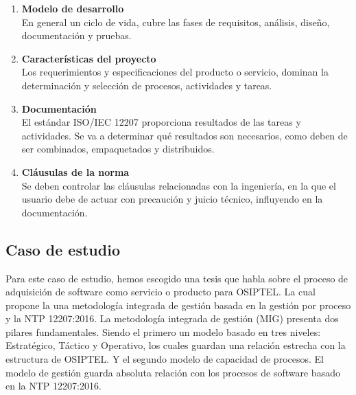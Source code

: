 \documentclass{article}
\begin{document}
\begin{enumerate}
\begin{enumerate}
            \item \textbf{Modelo de desarrollo}\\
                En general un ciclo de vida, cubre las fases de
                requisitos, análisis, diseño, documentación y pruebas.
            
            \item \textbf{Características del proyecto}\\
                Los requerimientos y especificaciones del
                producto o servicio, dominan la determinación y selección de
                procesos, actividades y tareas.

            \item \textbf{Documentación}\\
                El estándar ISO/IEC 12207 proporciona resultados
                de las tareas y actividades. Se va a determinar qué resultados
                son necesarios, como deben de ser combinados, empaquetados y
                distribuidos.
            
            \item \textbf{Cláusulas de la norma}\\
                Se deben controlar las cláusulas relacionadas
                con la ingeniería, en la que el usuario debe de actuar con
                precaución y juicio técnico, influyendo en la documentación.
            
        \end{enumerate}
        
\end{enumerate}

\subsection{Caso de estudio}\label{sec:Caso de Estudio}

Para este caso de estudio, hemos escogido una tesis \nocite{quinteros_estefani2019} que habla
sobre el proceso de adquisición de software como servicio o producto para
OSIPTEL. La cual propone la una metodología integrada de gestión basada en la
gestión por proceso y la NTP 12207:2016. La metodología integrada de gestión
(MIG) presenta dos pilares fundamentales. Siendo el primero un modelo basado en
tres niveles: Estratégico, Táctico y Operativo, los cuales guardan una relación
estrecha con la estructura de OSIPTEL. Y el segundo modelo de capacidad de
procesos. El modelo de gestión guarda absoluta relación con los procesos de
software basado en la NTP 12207:2016.
\end{document}
